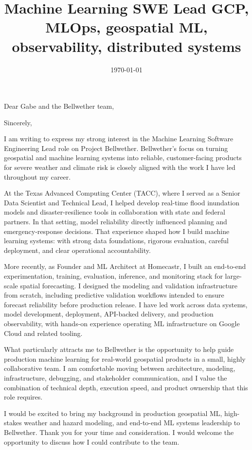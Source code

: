 \documentclass[letterpaper, 10pt,colorlinks,linkcolor=cyan]{moderncv}
\title{\large Machine Learning SWE Lead \textbullet{} GCP, MLOps, geospatial ML, observability, distributed systems}
\begin{document}
  \hypersetup{urlcolor=links}

  \date{\today}
  \opening{Dear Gabe and the Bellwether team,}
  \closing{Sincerely,}
  \makelettertitle

I am writing to express my strong interest in the Machine Learning Software Engineering Lead role on Project Bellwether. Bellwether's focus on turning geospatial and machine learning systems into reliable, customer-facing products for severe weather and climate risk is closely aligned with the work I have led throughout my career.

At the Texas Advanced Computing Center (TACC), where I served as a Senior Data Scientist and Technical Lead, I helped develop real-time flood inundation models and disaster-resilience tools in collaboration with state and federal partners. In that setting, model reliability directly influenced planning and emergency-response decisions. That experience shaped how I build machine learning systems: with strong data foundations, rigorous evaluation, careful deployment, and clear operational accountability.

More recently, as Founder and ML Architect at Homecastr, I built an end-to-end experimentation, training, evaluation, inference, and monitoring stack for large-scale spatial forecasting. I designed the modeling and validation infrastructure from scratch, including predictive validation workflows intended to ensure forecast reliability before production release. I have led work across data systems, model development, deployment, API-backed delivery, and production observability, with hands-on experience operating ML infrastructure on Google Cloud and related tooling.

What particularly attracts me to Bellwether is the opportunity to help guide production machine learning for real-world geospatial products in a small, highly collaborative team. I am comfortable moving between architecture, modeling, infrastructure, debugging, and stakeholder communication, and I value the combination of technical depth, execution speed, and product ownership that this role requires.

I would be excited to bring my background in production geospatial ML, high-stakes weather and hazard modeling, and end-to-end ML systems leadership to Bellwether. Thank you for your time and consideration. I would welcome the opportunity to discuss how I could contribute to the team.
\end{document}
